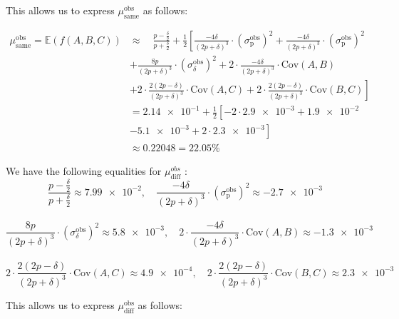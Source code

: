 This allows us to express \( \mu_{\text{same}}^{\text{obs}} \) as follows:

\begin{equation}
    \begin{aligned}
    \mu_{\text{same}}^{\text{obs}} = \mathbb{E}(f(A,B,C)) &\approx \quad \frac{p - \frac{\delta}{2}}{p + \frac{\delta}{2}} + \frac{1}{2} \left[ \frac{-4\delta}{(2p + \delta)^3}\cdot({\sigma^\text{obs}_{\text{p}}})^2 + \frac{-4\delta}{(2p + \delta)^3}\cdot({\sigma^\text{obs}_{\text{p}}})^2 \right. \\[2mm]
    & \left. + \frac{8p}{(2p + \delta)^3}\cdot({\sigma^\text{obs}_\delta})^2 + 2\cdot\frac{-4\delta}{(2p + \delta)^3}\cdot\text{Cov}(A,B) \right. \\[2mm] 
    & \left. + 2\cdot\frac{2(2p - \delta)}{(2p + \delta)^3}\cdot\text{Cov}(A,C) + 2\cdot\frac{2(2p - \delta)}{(2p + \delta)^3}\cdot\text{Cov}(B,C) \right]\\[10mm]
    & = \num{2.14e-1} + \frac{1}{2} \left[ -2\cdot\num{2.9e-3} + \num{1.9e-2}  \right. \\[2mm]
    & \left. - \num{5.1e-3} + 2\cdot\num{2.3e-3} \right] \\[10mm]
    & \approx 0.22048 = 22.05\%
    \end{aligned}
    \label{eq:mu_same_obs}
\end{equation}

We have the following equalities for \( \mu_{\text{diff}}^{obs} \) :
\[
    \frac{p - \frac{\delta}{2}}{p + \frac{\delta}{2}} \approx \num{7.99e-2}, \quad \frac{-4\delta}{(2p + \delta)^3}\cdot({\sigma^\text{obs}_{\text{p}}})^2 \approx -\num{2.7e-3}
 \]\\
 \[
    \frac{8p}{(2p + \delta)^3}\cdot({\sigma^\text{obs}_\delta})^2 \approx \num{5.8e-3}, \quad 2\cdot\frac{-4\delta}{(2p + \delta)^3}\cdot\text{Cov}(A,B) \approx -\num{1.3e-3}
 \]\\
 \[
    2\cdot\frac{2(2p - \delta)}{(2p + \delta)^3}\cdot\text{Cov}(A,C) \approx \num{4.9e-4}, \quad 2\cdot\frac{2(2p - \delta)}{(2p + \delta)^3}\cdot\text{Cov}(B,C) \approx \num{2.3e-3}
 \]

This allows us to express \( \mu_{\text{diff}}^{\text{obs}} \) as follows:

